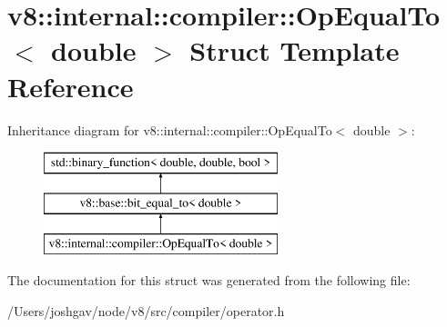 \hypertarget{structv8_1_1internal_1_1compiler_1_1_op_equal_to_3_01double_01_4}{}\section{v8\+:\+:internal\+:\+:compiler\+:\+:Op\+Equal\+To$<$ double $>$ Struct Template Reference}
\label{structv8_1_1internal_1_1compiler_1_1_op_equal_to_3_01double_01_4}
Inheritance diagram for v8\+:\+:internal\+:\+:compiler\+:\+:Op\+Equal\+To$<$ double $>$\+:\begin{figure}[H]
\begin{center}
\leavevmode
\includegraphics[height=3.000000cm]{structv8_1_1internal_1_1compiler_1_1_op_equal_to_3_01double_01_4}
\end{center}
\end{figure}


The documentation for this struct was generated from the following file\+:\begin{DoxyCompactItemize}
\item 
/\+Users/joshgav/node/v8/src/compiler/operator.\+h\end{DoxyCompactItemize}
